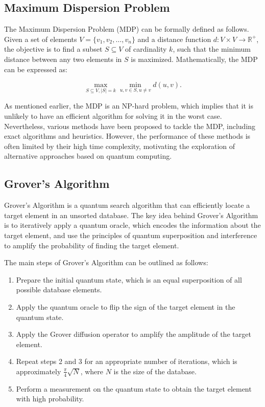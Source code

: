 \subsection{Maximum Dispersion Problem}

The Maximum Dispersion Problem (MDP) can be formally defined as follows. Given a set of elements $V = \{v_1, v_2, \dots, v_n\}$ and a distance function $d: V \times V \to \mathbb{R}^+$, the objective is to find a subset $S \subseteq V$ of cardinality $k$, such that the minimum distance between any two elements in $S$ is maximized. Mathematically, the MDP can be expressed as:

\begin{equation}
\max_{S \subseteq V, |S| = k} \min_{u, v \in S, u \neq v} d(u, v).
\end{equation}

As mentioned earlier, the MDP is an NP-hard problem, which implies that it is unlikely to have an efficient algorithm for solving it in the worst case. Nevertheless, various methods have been proposed to tackle the MDP, including exact algorithms and heuristics. However, the performance of these methods is often limited by their high time complexity, motivating the exploration of alternative approaches based on quantum computing.

\subsection{Grover's Algorithm}

Grover's Algorithm \cite{grover1996fast} is a quantum search algorithm that can efficiently locate a target element in an unsorted database. The key idea behind Grover's Algorithm is to iteratively apply a quantum oracle, which encodes the information about the target element, and use the principles of quantum superposition and interference to amplify the probability of finding the target element.

The main steps of Grover's Algorithm can be outlined as follows:

\begin{enumerate}
    \item Prepare the initial quantum state, which is an equal superposition of all possible database elements.
    
    \item Apply the quantum oracle to flip the sign of the target element in the quantum state.
    
    \item Apply the Grover diffusion operator to amplify the amplitude of the target element.
    
    \item Repeat steps 2 and 3 for an appropriate number of iterations, which is approximately $\frac{\pi}{4}\sqrt{N}$, where $N$ is the size of the database.
    
    \item Perform a measurement on the quantum state to obtain the target element with high probability.
\end{enumerate}

